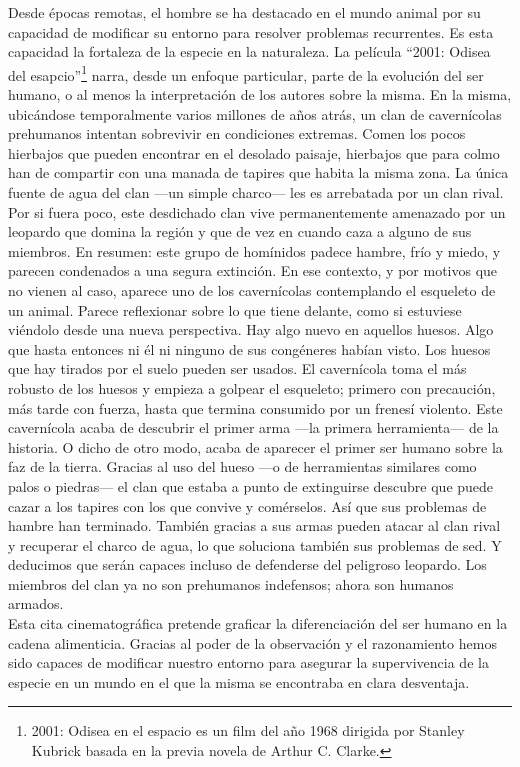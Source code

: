 Desde épocas remotas, el hombre se ha destacado en el mundo animal por su capacidad de modificar su entorno para resolver problemas recurrentes. Es esta capacidad la fortaleza de la especie en la naturaleza. La película ``2001: Odisea del esapcio''\footnote{2001: Odisea en el espacio es un film del año 1968 dirigida por Stanley Kubrick basada en la previa novela de Arthur C. Clarke.} narra, desde un enfoque particular, parte de la evolución del ser humano, o al menos la interpretación de los autores sobre la misma. En la misma, ubicándose temporalmente varios millones de años atrás, un clan de cavernícolas prehumanos intentan sobrevivir en condiciones extremas. Comen los pocos hierbajos que pueden encontrar en el desolado paisaje, hierbajos que para colmo han de compartir con una manada de tapires que habita la misma zona. La única fuente de agua del clan —un simple charco— les es arrebatada por un clan rival. Por si fuera poco, este desdichado clan vive permanentemente amenazado por un leopardo que domina la región y que de vez en cuando caza a alguno de sus miembros. En resumen: este grupo de homínidos padece hambre, frío y miedo, y parecen condenados a una segura extinción. En ese contexto, y por motivos que no vienen al caso, aparece uno de los cavernícolas contemplando el esqueleto de un animal. Parece reflexionar sobre lo que tiene delante, como si estuviese viéndolo desde una nueva perspectiva. Hay algo nuevo en aquellos huesos. Algo que hasta entonces ni él ni ninguno de sus congéneres habían visto. Los huesos que hay tirados por el suelo pueden ser usados. El cavernícola toma el más robusto de los huesos y empieza a golpear el esqueleto; primero con precaución, más tarde con fuerza, hasta que termina consumido por un frenesí violento. Este cavernícola acaba de descubrir el primer arma —la primera herramienta— de la historia. O dicho de otro modo, acaba de aparecer el primer ser humano sobre la faz de la tierra. Gracias al uso del hueso —o de herramientas similares como palos o piedras— el clan que estaba a punto de extinguirse descubre que puede cazar a los tapires con los que convive y comérselos. Así que sus problemas de hambre han terminado. También gracias a sus armas pueden atacar al clan rival y recuperar el charco de agua, lo que soluciona también sus problemas de sed. Y deducimos que serán capaces incluso de defenderse del peligroso leopardo. Los miembros del clan ya no son prehumanos indefensos; ahora son humanos armados.\\
Esta cita cinematográfica pretende graficar la diferenciación del ser humano en la cadena alimenticia. Gracias al poder de la observación y el razonamiento hemos sido capaces de modificar nuestro entorno para asegurar la supervivencia de la especie en un mundo en el que la misma se encontraba en clara desventaja.

